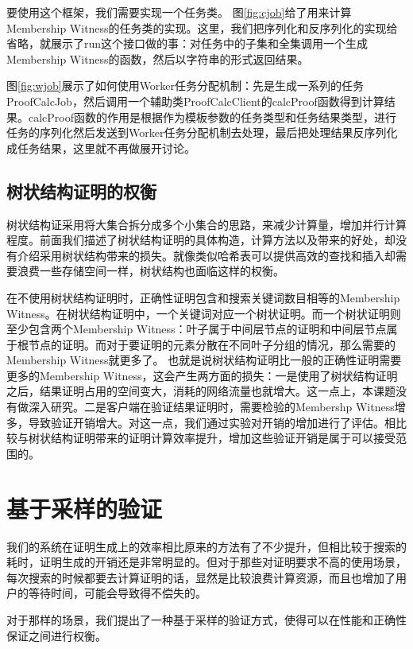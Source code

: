 要使用这个框架，我们需要实现一个任务类。
图\ref{fig:cjob}给了用来计算Membership Witness的任务类的实现。这里，我们把序列化和反序列化的实现给省略，就展示了run这个接口做的事：对任务中的子集和全集调用一个生成Membership Witness的函数，然后以字符串的形式返回结果。


图\ref{fig:wjob}展示了如何使用Worker任务分配机制：先是生成一系列的任务ProofCalcJob，然后调用一个辅助类ProofCalcClient的calcProof函数得到计算结果。calcProof函数的作用是根据作为模板参数的任务类型和任务结果类型，进行任务的序列化然后发送到Worker任务分配机制去处理，最后把处理结果反序列化成任务结果，这里就不再做展开讨论。
\subsection{树状结构证明的权衡}
树状结构证采用将大集合拆分成多个小集合的思路，来减少计算量，增加并行计算程度。前面我们描述了树状结构证明的具体构造，计算方法以及带来的好处，却没有介绍采用树状结构带来的损失。就像类似哈希表可以提供高效的查找和插入却需要浪费一些存储空间一样，树状结构也面临这样的权衡。

在不使用树状结构证明时，正确性证明包含和搜索关键词数目相等的Membership Witness。在树状结构证明中，一个关键词对应一个树状证明。而一个树状证明则至少包含两个Membership Witness：叶子属于中间层节点的证明和中间层节点属于根节点的证明。而对于要证明的元素分散在不同叶子分组的情况，那么需要的Membership Witness就更多了。
也就是说树状结构证明比一般的正确性证明需要更多的Membership Witness，这会产生两方面的损失：一是使用了树状结构证明之后，结果证明占用的空间变大，消耗的网络流量也就增大。这一点上，本课题没有做深入研究。二是客户端在验证结果证明时，需要检验的Membershp Witness增多，导致验证开销增大。对这一点，我们通过实验对开销的增加进行了评估。相比较与树状结构证明带来的证明计算效率提升，增加这些验证开销是属于可以接受范围的。

\section{基于采样的验证}
我们的系统在证明生成上的效率相比原来的方法有了不少提升，但相比较于搜索的耗时，证明生成的开销还是非常明显的。但对于那些对证明要求不高的使用场景，每次搜索的时候都要去计算证明的话，显然是比较浪费计算资源，而且也增加了用户的等待时间，可能会导致得不偿失的。

对于那样的场景，我们提出了一种基于采样的验证方式，使得可以在性能和正确性保证之间进行权衡。

